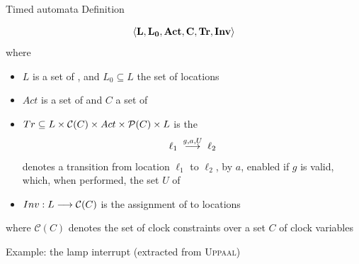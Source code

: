 \documentclass[aspectratio=169]{beamer}
\def\uppaal{\textsc{Uppaal}}
\def\cc#1{\mathcal{C}(#1)}
\begin{document}
\begin{slide}{Timed automata Definition}
\small

\vspace*{-1mm}
\begin{block}{}
\begin{equation*}
\mathbf{\mathopen{\langle}L, L_0, Act, C, Tr, Inv\mathclose{\rangle}}
\end{equation*}
\vspace*{-1mm}
where
\vspace*{-1mm}
\begin{itemize}
\item $L$ is a set of , and $L_0 \subseteq L$ the set of  locations
\item $Act$ is a set of  and $C$ a set of 
\item $Tr \subseteq L \times \cc{C} \times Act \times \pow{(C)} \times L$ is the 
\vspace*{-1mm}
\begin{equation*}
\ell_1\; \stackrel{g,a,U}{\longrightarrow}\;  \ell_2
\end{equation*}
\vspace*{-1mm}
denotes a transition from location $\ell_1$ to $\ell_2$,  by $a$, enabled if  $g$
is valid, which, when performed,  the set $U$ of 
\item $\fdec{Inv}{L}{\cc{C}}$ is the assignment of  to locations  
\end{itemize}
\vspace*{-1mm}
where $\cc{C}$ denotes the  set of clock constraints over a set $C$ of clock variables
\end{block}
\end{slide}

\begin{slide}{Example: the lamp interrupt}
\small
(extracted from \uppaal)

\begin{figure}[htb]
  \centering
\end{figure}

\vspace*{-3mm}

\end{slide}
\end{document}
